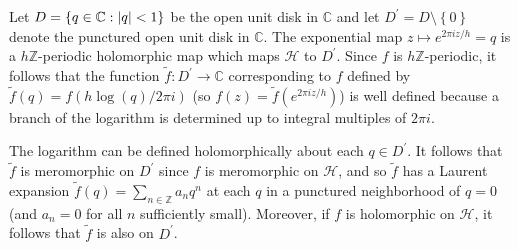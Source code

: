\documentclass[10pt,leqno,twoside]{article}
\theoremstyle{plain}
\theoremstyle{definition}
\numberwithin{equation}{section}
\numberwithin{lem}{section}
\newcommand{\cbr}[1]{\left\{#1\right\}}
\begin{document}
Let $D = \cbr{q\in\mathbb C : \abs{q} <1}$ be the open unit disk in $\mathbb C$ and let $D^\prime = D \setminus \!\cbr{0}$ denote the punctured open unit disk in $\mathbb C$. The exponential map $z\mapsto e^{2\pi i z/h} = q$ is a $h\mathbb{Z}$-periodic holomorphic map which maps $\mathcal H$ to $D^\prime$. Since $f$ is $h\mathbb{Z}$-periodic, it follows that the function $\tilde f\colon D^\prime\to\mathbb C$ corresponding to $f$ defined by $\tilde f(q) = f(h\log (q)/2\pi i)$ (so $f(z) = \tilde f(e^{2\pi i z/h})$) is well defined because a branch of the logarithm is determined up to integral multiples of $2\pi i$.

The logarithm can be defined holomorphically about each $q\in D^\prime$. It follows that $\tilde f$ is meromorphic on $D^\prime$ since $f$ is meromorphic on $\mathcal H$, and so $\tilde f$ has a Laurent expansion $\tilde f(q) = \sum_{n\in\mathbb Z}a_nq^n$ at each $q$ in a punctured neighborhood of $q=0$ (and $a_n = 0$ for all $n$ sufficiently small). Moreover, if $f$ is holomorphic on $\mathcal H$, it follows that $\tilde f$ is also on $D^\prime$.
\end{document}
